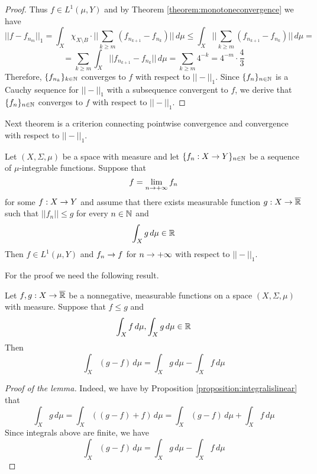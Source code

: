 \begin{proof}
Thus $f\in L^1(\mu,Y)$ and by Theorem \ref{theorem:monotoneconvergence} we have
$$||f - f_{n_m}||_1 = \int_X\chi_{X\setminus B}\cdot \big|\big|\sum_{k\geq m}\left(f_{n_{k+1}} - f_{n_k}\right)\big|\big|\,d\mu \leq  \int_X \big|\big|\sum_{k\geq m}\left(f_{n_{k+1}} - f_{n_k}\right)\big|\big|\,d\mu =$$
$$=\sum_{k\geq m}\int_X\big|\big|f_{n_{k+1}} - f_{n_k}\big|\big|\,d\mu = \sum_{k\geq m}4^{-k} = 4^{-m}\cdot \frac{4}{3} $$
Therefore, $\{f_{n_k}\}_{k\in {\mathbb N}}$ converges to $f$ with respect to $||-||_1$. Since $\{f_n\}_{n\in {\mathbb N}}$ is a Cauchy sequence for $||-||_1$ with a subsequence convergent to $f$, we derive that $\{f_n\}_{n\in {\mathbb N}}$ converges to $f$ with respect to $||-||_1$.
\end{proof}
\noindent
Next theorem is a criterion connecting pointwise convergence and convergence with respect to $||-||_1$.

\begin{theorem}\label{theorem:dominatedconvergence}
Let $(X,\Sigma,\mu)$ be a space with measure and let $\{f_n:X\rightarrow Y\}_{n\in {\mathbb N}}$ be a sequence of $\mu$-integrable functions. Suppose that
$$f = \lim_{n\rightarrow +\infty}f_n$$
for some $f:X\rightarrow Y$ and assume that there exists measurable function $g:X\rightarrow \overline{{\mathbb R}}$ such that $||f_n||\leq g$ for every $n\in {\mathbb N}$ and
$$\int_X g\,d\mu\in {\mathbb R}$$
Then $f\in L^1(\mu,Y)$ and $f_n \rightarrow f$ for $n\rightarrow +\infty$ with respect to $||-||_1$.
\end{theorem}
For the proof we need the following result.

\begin{lemma}\label{lemma:differenceofintegrals}
Let $f, g:X\rightarrow \overline{{\mathbb R}}$ be a nonnegative, measurable functions on a space $(X,\Sigma,\mu)$ with measure. Suppose that $f\leq g$ and
$$\int_Xf\,d\mu, \int_Xg\,d\mu\in {\mathbb R}$$
Then
$$\int_X(g-f)\,d\mu = \int_Xg\,d\mu - \int_Xf\,d\mu$$
\end{lemma}
\begin{proof}[Proof of the lemma]
Indeed, we have by Proposition \ref{proposition:integralislinear} that
$$\int_Xg\,d\mu = \int_X\left((g-f) + f\right)\,d\mu = \int_X(g-f)\,d\mu + \int_Xf\,d\mu$$
Since integrals above are finite, we have
$$\int_X(g-f)\,d\mu = \int_Xg\,d\mu - \int_Xf\,d\mu$$
\end{proof}


